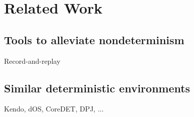 
\section{Related Work}

\subsection{Tools to alleviate nondeterminism}
Record-and-replay

\subsection{Similar deterministic environments}
Kendo, dOS, CoreDET, DPJ, ...

\endinput


